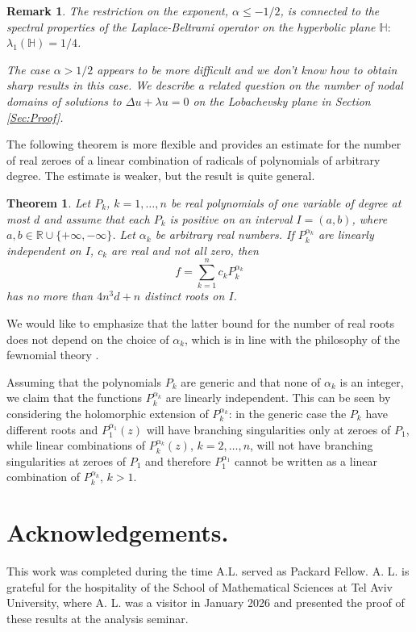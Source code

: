 \documentclass{article}
\newcommand{\Hh}{\mathbb{H}}
\newtheorem{theorem}{Theorem}[section]
\newtheorem{remark}{Remark}[section]
\begin{document}
\begin{remark}
The restriction on the exponent, $\alpha \le -1/2$, is connected to the spectral properties of the Laplace-Beltrami operator on the hyperbolic plane $\Hh:$ $\lambda_1(\Hh)=1/4$. 

 The case $\alpha>1/2$ appears to be more difficult and we don't know how to obtain sharp results in this case. We describe a related question on the number of nodal domains of solutions to $\Delta u + \lambda u=0$ on the Lobachevsky plane in Section \ref{Sec:Proof}.
\end{remark}

The following theorem is more flexible and provides an estimate for the number of real zeroes of a linear combination of radicals of polynomials of arbitrary degree. The estimate is weaker, but the result is quite general.

 \begin{theorem} \label{Main 3}
Let $P_k$, $k=1,\dots,n$ be real polynomials of one variable of degree at most $d$ and assume that each $P_k$ is positive on an interval $I=(a,b)$, where $a,b \in \mathbb{R}\cup\{+\infty,-\infty\}$. Let $\alpha_k$ be arbitrary real numbers. If $P_k^{\alpha_k}$ are linearly independent on $I$, $c_k$ are real and not all zero, then $$f=\sum_{k=1}^{n} c_k P_k^{\alpha_k}$$
has no more than $4n^3d+n$ distinct roots on $I$. 


\end{theorem}
 
We would like to emphasize that the latter bound for the number of real roots does not depend on the choice of $\alpha_k$, which is in line with the philosophy of the fewnomial theory \cite{K}.

Assuming that the polynomials $P_k$ are generic and that none of $\alpha_k$ is an integer, we claim that the functions $P_k^{\alpha_k}$ are linearly independent. This can be seen by considering the holomorphic extension of $P_k^{\alpha_k}$:
in the generic case the $P_k$ have different roots and $P_1^{\alpha_1}(z)$ will have branching singularities only at zeroes of $P_1$, while linear combinations of $P_k^{\alpha_k}(z)$, $k=2,\dots, n$, will not have branching singularities at zeroes of $P_1$ and therefore $P_1^{\alpha_1}$ cannot be written as a linear combination of $P_k^{\alpha_k}$, $k>1$.

\section*{Acknowledgements.}
 This work was completed during the time A.L. served as Packard Fellow. A. L. is grateful for the hospitality of the School of Mathematical Sciences at Tel Aviv University, where A. L. was a visitor in January 2026 and presented the proof of these results at the analysis seminar.
\end{document}
